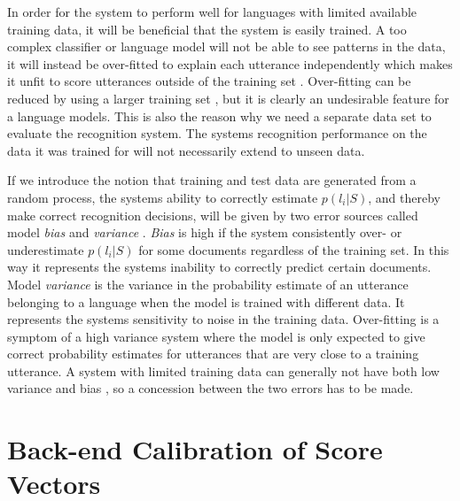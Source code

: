 In order for the system to perform well for languages with limited available training data, it will be beneficial that the system is easily trained. A too complex classifier or language model will not be able to see patterns in the data, it will instead be over-fitted to explain each utterance independently which makes it unfit to score utterances outside of the training set \cite[311]{information}. Over-fitting can be reduced by using a larger training set \cite[147]{machinelearningbook}, but it is clearly an undesirable feature for a language models. This is also the reason why we need a separate data set to evaluate the recognition system. The systems recognition performance on the data it was trained for will not necessarily extend to unseen data.

If we introduce the notion that training and test data are generated from a random process, the systems ability to correctly estimate $p(l_i | S)$, and thereby make correct recognition decisions, will be given by two error sources called model \emph{bias} and \emph{variance} \cite[149]{machinelearningbook}. \emph{Bias} is high if the system consistently over- or underestimate $p(l_i | S)$ for some documents regardless of the training set. In this way it represents the systems inability to correctly predict certain documents. Model \emph{variance} is the variance in the probability estimate of an utterance belonging to a language when the model is trained with different data. It represents the systems sensitivity to noise in the training data. Over-fitting is a symptom of a high variance system where the model is only expected to give correct probability estimates for utterances that are very close to a training utterance. A system with limited training data can generally not have both low variance and bias \cite[312]{information}, so a concession between the two errors has to be made.


\section{Back-end Calibration of Score Vectors}
\label{sect:backendscoring}

